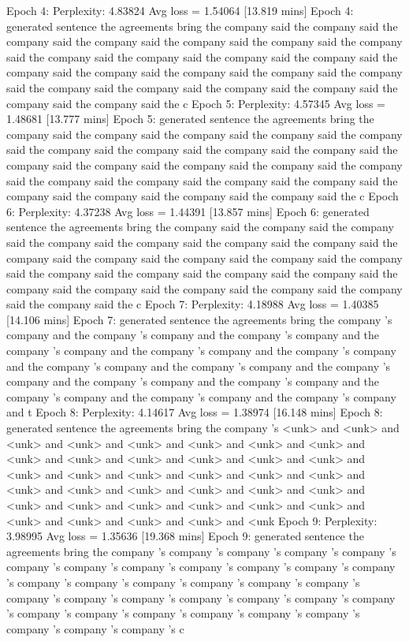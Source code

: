\documentclass{article}
\begin{document}
Epoch 4: Perplexity: 4.83824 Avg loss = 1.54064 [13.819 mins]
Epoch 4: generated sentence 
the agreements bring the company said the company said the company said the company said the company said the company said the company said the company said the company said the company said the company said the company said the company said the company said the company said the company said the company said the company said the company said the company said the company said the company said the c
Epoch 5: Perplexity: 4.57345 Avg loss = 1.48681 [13.777 mins]
Epoch 5: generated sentence 
the agreements bring the company said the company said the company said the company said the company said the company said the company said the company said the company said the company said the company said the company said the company said the company said the company said the company said the company said the company said the company said the company said the company said the company said the c
Epoch 6: Perplexity: 4.37238 Avg loss = 1.44391 [13.857 mins]
Epoch 6: generated sentence 
the agreements bring the company said the company said the company said the company said the company said the company said the company said the company said the company said the company said the company said the company said the company said the company said the company said the company said the company said the company said the company said the company said the company said the company said the c
Epoch 7: Perplexity: 4.18988 Avg loss = 1.40385 [14.106 mins]
Epoch 7: generated sentence 
the agreements bring the company 's company and the company 's company and the company 's company and the company 's company and the company 's company and the company 's company and the company 's company and the company 's company and the company 's company and the company 's company and the company 's company and the company 's company and the company 's company and the company 's company and t
Epoch 8: Perplexity: 4.14617 Avg loss = 1.38974 [16.148 mins]
Epoch 8: generated sentence 
the agreements bring the company 's <unk> and <unk> and <unk> and <unk> and <unk> and <unk> and <unk> and <unk> and <unk> and <unk> and <unk> and <unk> and <unk> and <unk> and <unk> and <unk> and <unk> and <unk> and <unk> and <unk> and <unk> and <unk> and <unk> and <unk> and <unk> and <unk> and <unk> and <unk> and <unk> and <unk> and <unk> and <unk> and <unk> and <unk> and <unk> and <unk> and <unk
Epoch 9: Perplexity: 3.98995 Avg loss = 1.35636 [19.368 mins]
Epoch 9: generated sentence 
the agreements bring the company 's company 's company 's company 's company 's company 's company 's company 's company 's company 's company 's company 's company 's company 's company 's company 's company 's company 's company 's company 's company 's company 's company 's company 's company 's company 's company 's company 's company 's company 's company 's company 's company 's company 's c
\end{document}
